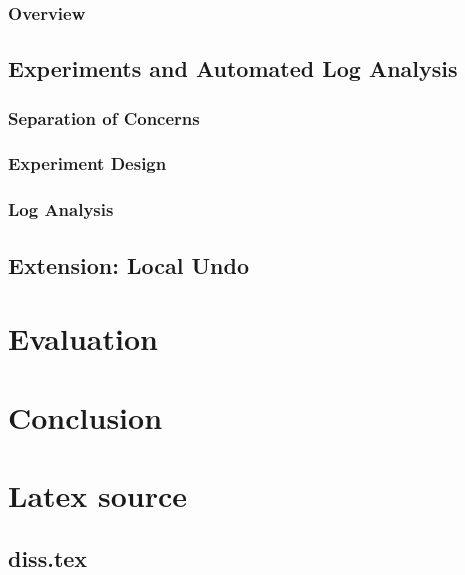 \documentclass[12pt,a4paper,twoside,openright]{report}
\begin{document}
	\subsection{Overview}
	
\section{Experiments and Automated Log Analysis}

	\subsection{Separation of Concerns}
	
	\subsection{Experiment Design}
	
	\subsection{Log Analysis}
	
\section{Extension: Local Undo}


\chapter{Evaluation}


\chapter{Conclusion}



\printbibliography

\appendix

\chapter{Latex source}

\section{diss.tex}
{\scriptsize}
\end{document}
